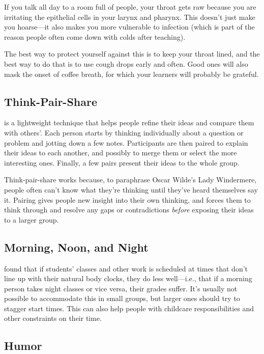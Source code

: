 If you talk all day to a room full of people, your throat gets raw
because you are irritating the epithelial cells in your larynx and
pharynx. This doesn't just make you hoarse---it also makes you more
vulnerable to infection (which is part of the reason people often come
down with colds after teaching).

The best way to protect yourself against this is to keep your throat
lined, and the best way to do that is to use cough drops early and
often. Good ones will also mask the onset of coffee breath, for which
your learners will probably be grateful.

\subsection*{Think-Pair-Share}

 is a lightweight technique
that helps people refine their ideas and compare them with
others'. Each person starts by thinking individually about a question
or problem and jotting down a few notes. Participants are then paired
to explain their ideas to each another, and possibly to merge them or
select the more interesting ones. Finally, a few pairs present their
ideas to the whole group.

Think-pair-share works because, to paraphrase Oscar Wilde's Lady
Windermere, people often can't know what they're thinking until they've
heard themselves say it. Pairing gives people new insight into their own
thinking, and forces them to think through and resolve any gaps or
contradictions \emph{before} exposing their ideas to a larger group.

\subsection*{Morning, Noon, and Night}

\cite{Smar2018} found that if students' classes and other work is
scheduled at times that don't line up with their natural body clocks,
they do less well---i.e., that if a morning person takes night classes or
vice versa, their grades suffer. It's usually not possible to
accommodate this in small groups, but larger ones should try to stagger
start times. This can also help people with childcare responsibilities
and other constraints on their time.

\subsection*{Humor}

